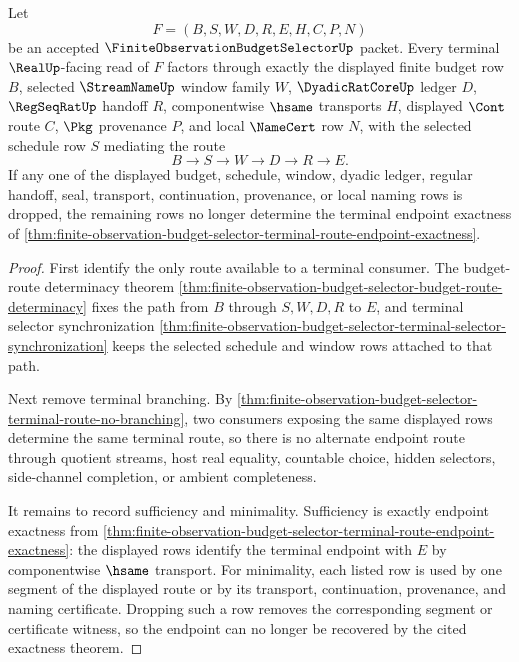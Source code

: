 \begin{theorem}
\label{thm:finite-observation-budget-selector-terminal-window-minimality}
Let
$$
F=(B,S,W,D,R,E,H,C,P,N)
$$
be an accepted $\FiniteObservationBudgetSelectorUp$ packet. Every terminal $\RealUp$-facing read of $F$ factors through exactly the displayed finite budget row $B$, selected $\StreamNameUp$ window family $W$, $\DyadicRatCoreUp$ ledger $D$, $\RegSeqRatUp$ handoff $R$, componentwise $\hsame$ transports $H$, displayed $\Cont$ route $C$, $\Pkg$ provenance $P$, and local $\NameCert$ row $N$, with the selected schedule row $S$ mediating the route
$$
B \to S \to W \to D \to R \to E.
$$
If any one of the displayed budget, schedule, window, dyadic ledger, regular handoff, seal, transport, continuation, provenance, or local naming rows is dropped, the remaining rows no longer determine the terminal endpoint exactness of \autoref{thm:finite-observation-budget-selector-terminal-route-endpoint-exactness}.
\end{theorem}
\begin{proof}
First identify the only route available to a terminal consumer. The budget-route determinacy theorem \autoref{thm:finite-observation-budget-selector-budget-route-determinacy} fixes the path from $B$ through $S,W,D,R$ to $E$, and terminal selector synchronization \autoref{thm:finite-observation-budget-selector-terminal-selector-synchronization} keeps the selected schedule and window rows attached to that path.

Next remove terminal branching. By \autoref{thm:finite-observation-budget-selector-terminal-route-no-branching}, two consumers exposing the same displayed rows determine the same terminal route, so there is no alternate endpoint route through quotient streams, host real equality, countable choice, hidden selectors, side-channel completion, or ambient completeness.

It remains to record sufficiency and minimality. Sufficiency is exactly endpoint exactness from \autoref{thm:finite-observation-budget-selector-terminal-route-endpoint-exactness}: the displayed rows identify the terminal endpoint with $E$ by componentwise $\hsame$ transport. For minimality, each listed row is used by one segment of the displayed route or by its transport, continuation, provenance, and naming certificate. Dropping such a row removes the corresponding segment or certificate witness, so the endpoint can no longer be recovered by the cited exactness theorem.
\end{proof}

